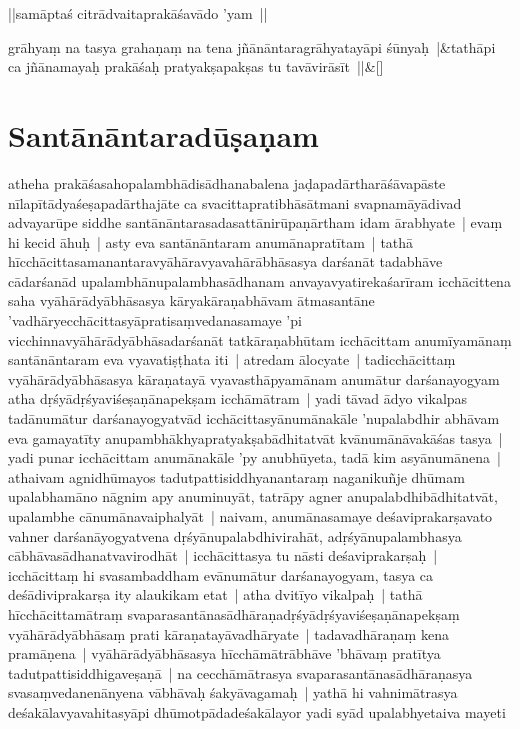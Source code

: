 \documentclass[article,a4paper]{memoir}
\begin{document}
	  \pstart ||samā\-ptaś citrā\-dvaitaprakā\-śavā\-do 'yam ||
	\pend
      
	    
	    \stanza[\smallbreak]
grā\-hyaṃ na tasya grahaṇaṃ na tena jñā\-nā\-ntaragrā\-hyatayā\-pi śū\-nyaḥ |&tathā\-pi ca jñā\-namayaḥ prakā\-śaḥ pratyakṣapakṣas tu tavā\-virā\-sī\-t ||\&[\smallbreak]


	
	  
	
\section[{Santā\-nā\-ntaradū\-ṣaṇam}]{Santā\-nā\-ntaradū\-ṣaṇam}\label{Santānāntaradūṣaṇam}

	  \pstart atheha prakā\-śasahopalambhā\-disā\-dhanabalena jaḍapadā\-rtharā\-śā\-vapā\-ste nī\-lapī\-tā\-dyaśeṣapadā\-rthajā\-te ca svacittapratibhā\-sā\-tmani svapnamā\-yā\-divad advayarū\-pe siddhe santā\-nā\-ntarasadasattā\-nirū\-paṇā\-rtham idam ā\-rabhyate | \label{thakur75-145.6} evaṃ hi kecid ā\-huḥ | asty eva santā\-nā\-ntaram anumā\-napratī\-tam | tathā\- hī\-cchā\-cittasamanantaravyā\-hā\-ravyavahā\-rā\-bhā\-sasya darśanā\-t tadabhā\-ve cā\-darśanā\-d upalambhā\-nupalambhasā\-dhanam anvayavyatirekaśarī\-ram icchā\-cittena saha vyā\-hā\-rā\-dyā\-bhā\-sasya kā\-ryakā\-raṇabhā\-vam ā\-tmasantā\-ne 'vadhā\-ryecchā\-cittasyā\-pratisaṃvedanasamaye 'pi vicchinnavyā\-hā\-rā\-dyā\-bhā\-sadarśanā\-t tatkā\-raṇabhū\-tam icchā\-cittam anumī\-yamā\-naṃ santā\-nā\-ntaram eva vyavatiṣṭhata iti | \label{thakur75-145.12} atredam ā\-locyate | tadicchā\-cittaṃ vyā\-hā\-rā\-dyā\-bhā\-sasya kā\-raṇatayā\- vyavasthā\-pyamā\-nam anumā\-tur darśanayogyam atha dṛśyā\-dṛśyaviśeṣaṇā\-napekṣam icchā\-mā\-tram | yadi tā\-vad ā\-dyo vikalpas tadā\-numā\-tur darśanayogyatvā\-d icchā\-cittasyā\-numā\-nakā\-le 'nupalabdhir abhā\-vam eva gamayatī\-ty anupambhā\-khyapratyakṣabā\-dhitatvā\-t kvā\-numā\-nā\-vakā\-śas tasya | yadi punar icchā\-cittam anumā\-nakā\-le 'py anubhū\-yeta, tadā\- kim asyā\-numā\-nena | athaivam agnidhū\-mayos tadutpattisiddhyanantaraṃ naganikuñje dhū\-mam upalabhamā\-no nā\-gnim apy anuminuyā\-t, tatrā\-py agner anupalabdhibā\-dhitatvā\-t, upalambhe cā\-numā\-navaiphalyā\-t | naivam, anumā\-nasamaye deśaviprakarṣavato vahner darśanā\-yogyatvena dṛśyā\-nupalabdhivirahā\-t, adṛśyā\-nupalambhasya cā\-bhā\-vasā\-dhanatvavirodhā\-t | icchā\-cittasya tu nā\-sti deśaviprakarṣaḥ | icchā\-cittaṃ hi svasambaddham evā\-numā\-tur darśanayogyam, tasya ca deśā\-diviprakarṣa ity alaukikam etat | \label{thakur75-145.23} atha dvitī\-yo vikalpaḥ | tathā\- hī\-cchā\-cittamā\-traṃ svaparasantā\-nasā\-dhā\-raṇadṛśyā\-dṛśyaviśeṣaṇā\-napekṣaṃ vyā\-hā\-rā\-dyā\-bhā\-saṃ prati kā\-raṇatayā\-vadhā\-ryate | tadavadhā\-raṇaṃ kena pramā\-ṇena | vyā\-hā\-rā\-dyā\-bhā\-sasya hī\-cchā\-mā\-trā\-bhā\-ve 'bhā\-vaṃ pratī\-tya tadutpattisiddhigaveṣaṇā\- | na cecchā\-mā\-trasya svaparasantā\-nasā\-dhā\-raṇasya svasaṃvedanenā\-nyena vā\-bhā\-vaḥ śakyā\-vagamaḥ | yathā\- hi vahnimā\-trasya deśakā\-lavyavahitasyā\-pi dhū\-motpā\-dadeśakā\-layor yadi syā\-d upalabhyetaiva mayeti 
\end{document}
